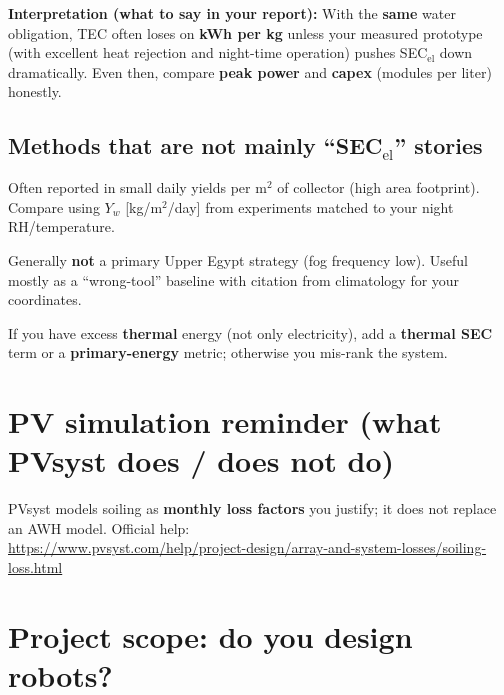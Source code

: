 \documentclass[11pt,a4paper]{article}
\begin{document}
\noindent\textbf{Interpretation (what to say in your report):} With the \textbf{same} water obligation, TEC often loses on \textbf{kWh per kg} unless your measured prototype (with excellent heat rejection and night-time operation) pushes SEC$_{\mathrm{el}}$ down dramatically. Even then, compare \textbf{peak power} and \textbf{capex} (modules per liter) honestly.

\subsection{Methods that are \textbf{not} mainly ``SEC$_{\mathrm{el}}$'' stories}
\begin{description}[style=nextline,leftmargin=0pt,labelwidth=!]
  \item[Passive dew / radiative collectors] Often reported in small daily yields per m$^2$ of collector (high area footprint). Compare using $Y_w$ [kg/m$^2$/day] from experiments matched to your night RH/temperature.
  \item[Fog collection] Generally \textbf{not} a primary Upper Egypt strategy (fog frequency low). Useful mostly as a ``wrong-tool'' baseline with citation from climatology for your coordinates.
  \item[Sorption with heat integration] If you have excess \textbf{thermal} energy (not only electricity), add a \textbf{thermal SEC} term or a \textbf{primary-energy} metric; otherwise you mis-rank the system.
\end{description}

\section{PV simulation reminder (what PVsyst does / does not do)}
PVsyst models soiling as \textbf{monthly loss factors} you justify; it does not replace an AWH model. Official help:\\
\url{https://www.pvsyst.com/help/project-design/array-and-system-losses/soiling-loss.html}

\section{Project scope: do you design robots?}
\end{document}
